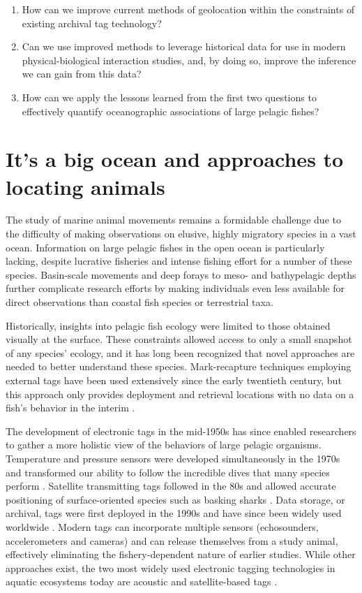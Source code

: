 \begin{enumerate}
    \item How can we improve current methods of geolocation within the constraints of existing archival tag technology?
    \item Can we use improved methods to leverage historical data for use in modern physical-biological interaction studies, and, by doing so, improve the inference we can gain from this data?
    \item How can we apply the lessons learned from the first two questions to effectively quantify oceanographic associations of large pelagic fishes?
\end{enumerate}

\section{It's a big ocean and approaches to locating animals}
The study of marine animal movements remains a formidable challenge due to the difficulty of making observations on elusive, highly migratory species in a vast ocean. Information on large pelagic fishes in the open ocean is particularly lacking, despite lucrative fisheries and intense fishing effort for a number of these species. Basin-scale movements \citep{Skomal2009} and deep forays to meso- and bathypelagic depths \citep{Thorrold2014} further complicate research efforts by making individuals even less available for direct observations than coastal fish species or terrestrial taxa.

Historically, insights into pelagic fish ecology were limited to those obtained visually at the surface. These constraints allowed access to only a small snapshot of any species' ecology, and it has long been recognized that novel approaches are needed to better understand these species. Mark-recapture techniques employing external tags have been used extensively since the early twentieth century, but this approach only provides deployment and retrieval locations with no data on a fish's behavior in the interim \citep{Kohler2001}.

The development of electronic tags in the mid-1950s has since enabled researchers to gather a more holistic view of the behaviors of large pelagic organisms. Temperature and pressure sensors were developed simultaneously in the 1970s and transformed our ability to follow the incredible dives that many species perform \citep{Carey1981}. Satellite transmitting tags followed in the 80s and allowed accurate positioning of surface-oriented species such as basking sharks \citep{Priede1984}. Data storage, or archival, tags were first deployed in the 1990s and have since been widely used worldwide \citep{Hussey2015}. Modern tags can incorporate multiple sensors (\eg echosounders, accelerometers and cameras) and can release themselves from a study animal, effectively eliminating the fishery-dependent nature of earlier studies. While other approaches exist, the two most widely used electronic tagging technologies in aquatic ecosystems today are acoustic and satellite-based tags \citep{Hussey2015}.

